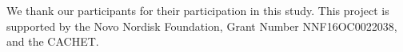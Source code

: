 We thank our participants for their participation in this study. This project is supported by the Novo Nordisk Foundation, Grant Number NNF16OC0022038, and the \ac{CACHET}.
